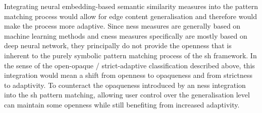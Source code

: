 \documentclass[11pt]{scrreprt}
\begin{document}
Integrating neural embedding-based semantic similarity measures into the pattern matching process would allow for edge content generalisation and therefore would make the process more adaptive. Since \gls{ness} measures are generally based on machine learning methods and \gls{cness} measures specifically are mostly based on deep neural network, they principally do not provide the openness that is inherent to the purely symbolic pattern matching process of the \gls{sh} framework. In the sense of the open-opaque / strict-adaptive classification described above, this integration would mean a shift from openness to opaqueness and from strictness to adaptivity. To counteract the opaqueness introduced by an \gls{ness} integration into the \gls{sh} pattern matching, allowing user control over the generalisation level can maintain some openness while still benefiting from increased adaptivity.




\end{document}
